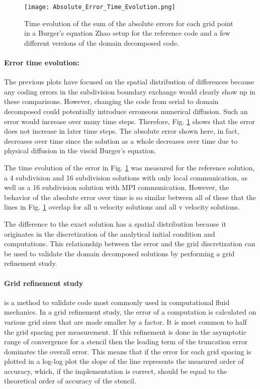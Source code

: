 \begin{figure}[!htbp]
\centering
\texttt{[image: Absolute\_Error\_Time\_Evolution.png]}
\caption{Time evolution of the sum of the absolute errors for each grid point in a Burger's equation Zhao setup for the reference code and a few different versions of the domain decomposed code.}
\label{fig:burgers_time_evolution}
\end{figure}

\paragraph{Error time evolution:}
The previous plots have focused on the spatial distribution of differences because any coding errors in the subdivision boundary exchange would clearly show up in these comparisons.
However, changing the code from serial to domain decomposed could potentially introduce erroneous numerical diffusion.
Such an error would increase over many time steps.
Therefore, Fig. \ref{fig:burgers_time_evolution} shows that the error does not increase in later time steps.
The absolute error shown here, in fact, decreases over time since the solution as a whole decreases over time due to physical diffusion in the viscid Burger's equation.

The time evolution of the error in Fig. \ref{fig:burgers_time_evolution} was measured for the reference solution, a 4 subdivision and 16 subdivision solutions with only local communication, as well as a 16 subdivision solution with MPI communication.
However, the behavior of the absolute error over time is so similar between all of these that the lines in Fig. \ref{fig:burgers_time_evolution} overlap for all u velocity solutions and all v velocity solutions.

The difference to the exact solution has a spatial distribution because it originates in the discretization of the analytical initial condition and computations.
This relationship between the error and the grid discretization can be used to validate the domain decomposed solutions by performing a grid refinement study.

\paragraph{Grid refinement study} is a method to validate code most commonly used in computational fluid mechanics.
In a grid refinement study, the error of a computation is calculated on various grid sizes that are made smaller by a factor.
It is most common to half the grid spacing per measurement.
If this refinement is done in the asymptotic range of convergence for a stencil then the leading term of the truncation error dominates the overall error.
This means that if the error for each grid spacing is plotted in a log-log plot the slope of the line represents the measured order of accuracy, which, if the implementation is correct, should be equal to the theoretical order of accuracy of the stencil.

